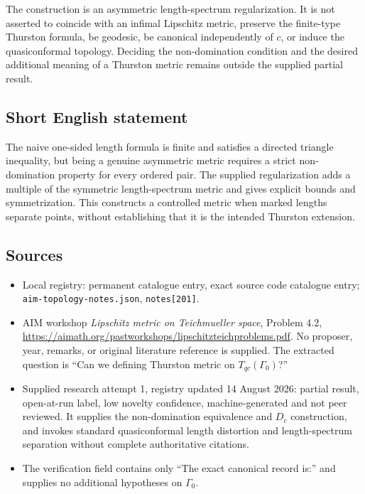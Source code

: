 \documentclass[11pt]{article}
\begin{document}
The construction is an asymmetric length-spectrum regularization. It is not asserted to coincide with an infimal Lipschitz metric, preserve the finite-type Thurston formula, be geodesic, be canonical independently of $c$, or induce the quasiconformal topology. Deciding the non-domination condition and the desired additional meaning of a Thurston metric remains outside the supplied partial result.
\subsection{Short English statement}
The naive one-sided length formula is finite and satisfies a directed triangle inequality, but being a genuine asymmetric metric requires a strict non-domination property for every ordered pair. The supplied regularization adds a multiple of the symmetric length-spectrum metric and gives explicit bounds and symmetrization. This constructs a controlled metric when marked lengths separate points, without establishing that it is the intended Thurston extension.
\subsection{Sources}
\begin{itemize}
\item Local registry: permanent catalogue entry, exact source code catalogue entry; \texttt{aim-topology-notes.json}, \texttt{notes[201]}.
\item AIM workshop \emph{Lipschitz metric on Teichmueller space}, Problem 4.2, \url{https://aimath.org/pastworkshops/lipschitzteichproblems.pdf}. No proposer, year, remarks, or original literature reference is supplied. The extracted question is ``Can we defining Thurston metric on $T_{qc}(\Gamma_0)$?''
\item Supplied research attempt 1, registry updated 14 August 2026: partial result, open-at-run label, low novelty confidence, machine-generated and not peer reviewed. It supplies the non-domination equivalence and $D_c$ construction, and invokes standard quasiconformal length distortion and length-spectrum separation without complete authoritative citations.
\item The verification field contains only ``The exact canonical record is:'' and supplies no additional hypotheses on $\Gamma_0$.
\end{itemize}
\end{document}

